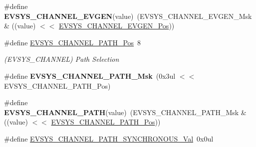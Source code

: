 \begin{DoxyCompactItemize}
\item 
\hypertarget{group___s_a_m_l21___e_v_s_y_s_gafb88af9747846db450470c6bbab09664}{}\#define {\bfseries E\+V\+S\+Y\+S\+\_\+\+C\+H\+A\+N\+N\+E\+L\+\_\+\+E\+V\+G\+E\+N}(value)~(E\+V\+S\+Y\+S\+\_\+\+C\+H\+A\+N\+N\+E\+L\+\_\+\+E\+V\+G\+E\+N\+\_\+\+Msk \& ((value) $<$$<$ \hyperlink{group___s_a_m_l21___e_v_s_y_s_ga49da646ddac2acf9b067c8299b5f6335}{E\+V\+S\+Y\+S\+\_\+\+C\+H\+A\+N\+N\+E\+L\+\_\+\+E\+V\+G\+E\+N\+\_\+\+Pos}))\label{group___s_a_m_l21___e_v_s_y_s_gafb88af9747846db450470c6bbab09664}

\item 
\hypertarget{group___s_a_m_l21___e_v_s_y_s_ga1c99b6755155dc2b405c63587973570b}{}\#define \hyperlink{group___s_a_m_l21___e_v_s_y_s_ga1c99b6755155dc2b405c63587973570b}{E\+V\+S\+Y\+S\+\_\+\+C\+H\+A\+N\+N\+E\+L\+\_\+\+P\+A\+T\+H\+\_\+\+Pos}~8\label{group___s_a_m_l21___e_v_s_y_s_ga1c99b6755155dc2b405c63587973570b}

\begin{DoxyCompactList}\small\item\em (E\+V\+S\+Y\+S\+\_\+\+C\+H\+A\+N\+N\+E\+L) Path Selection \end{DoxyCompactList}\item 
\hypertarget{group___s_a_m_l21___e_v_s_y_s_ga8b3ef7a0b4006e53d02e028a7357290d}{}\#define {\bfseries E\+V\+S\+Y\+S\+\_\+\+C\+H\+A\+N\+N\+E\+L\+\_\+\+P\+A\+T\+H\+\_\+\+Msk}~(0x3ul $<$$<$ E\+V\+S\+Y\+S\+\_\+\+C\+H\+A\+N\+N\+E\+L\+\_\+\+P\+A\+T\+H\+\_\+\+Pos)\label{group___s_a_m_l21___e_v_s_y_s_ga8b3ef7a0b4006e53d02e028a7357290d}

\item 
\hypertarget{group___s_a_m_l21___e_v_s_y_s_gaa4ef9ef1fcd09eb4482879454e79421a}{}\#define {\bfseries E\+V\+S\+Y\+S\+\_\+\+C\+H\+A\+N\+N\+E\+L\+\_\+\+P\+A\+T\+H}(value)~(E\+V\+S\+Y\+S\+\_\+\+C\+H\+A\+N\+N\+E\+L\+\_\+\+P\+A\+T\+H\+\_\+\+Msk \& ((value) $<$$<$ \hyperlink{group___s_a_m_l21___e_v_s_y_s_ga1c99b6755155dc2b405c63587973570b}{E\+V\+S\+Y\+S\+\_\+\+C\+H\+A\+N\+N\+E\+L\+\_\+\+P\+A\+T\+H\+\_\+\+Pos}))\label{group___s_a_m_l21___e_v_s_y_s_gaa4ef9ef1fcd09eb4482879454e79421a}

\item 
\hypertarget{group___s_a_m_l21___e_v_s_y_s_gaf113bdb42f1664532afb160e78b39fdb}{}\#define \hyperlink{group___s_a_m_l21___e_v_s_y_s_gaf113bdb42f1664532afb160e78b39fdb}{E\+V\+S\+Y\+S\+\_\+\+C\+H\+A\+N\+N\+E\+L\+\_\+\+P\+A\+T\+H\+\_\+\+S\+Y\+N\+C\+H\+R\+O\+N\+O\+U\+S\+\_\+\+Val}~0x0ul\label{group___s_a_m_l21___e_v_s_y_s_gaf113bdb42f1664532afb160e78b39fdb}


\end{DoxyCompactItemize}
